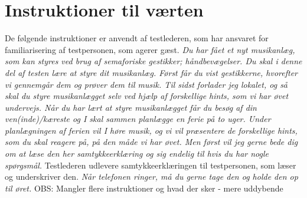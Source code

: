 \chapter{Instruktioner til værten}
\label{app:InstruktionerVaert}
%
De følgende instruktioner er anvendt af testlederen, som har ansvaret for familiarisering af testpersonen, som agerer gæst. \blankline
%
\textit{Du har fået et nyt musikanlæg, som kan styres ved brug af semaforiske gestikker; håndbevægelser. Du skal i denne del af testen lære at styre dit musikanlæg. Først får du vist gestikkerne, hvorefter vi gennemgår dem og prøver dem til musik. Til sidst forlader jeg lokalet, og så skal du styre musikanlægget selv ved hjælp af forskellige hints, som vi har øvet undervejs. Når du har lært at styre musikanlægget får du besøg af din ven(inde)/kæreste og I skal sammen planlægge en ferie på to uger. Under planlægningen af ferien vil I høre musik, og vi vil præsentere de forskellige hints, som du skal reagere på, på den måde vi har øvet. Men først vil jeg gerne bede dig om at læse den her samtykkeerklæring og sig endelig til hvis du har nogle spørgsmål.}\blankline
%
Testlederen udlevere samtykkeerklæringen til testpersonen, som læser og underskriver den. \blankline
%
\textit{Når telefonen ringer, må du gerne tage den og holde den op til øret.}\blankline
%
OBS: Mangler flere instruktioner og hvad der sker - mere uddybende 